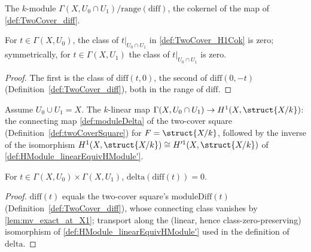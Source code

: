 \begin{definition}
  \label{def:TwoCover_H1Cok}
  \leanok
  The \(k\)-module \(\Gamma(X, U_0 \cap U_1)/\mathrm{range}(\mathrm{diff})\), the cokernel of
  the map of \ref{def:TwoCover_diff}.
\end{definition}

\begin{lemma}
  \label{lem:TwoCover_h1Cok_mk_res}
  \leanok
  For \(t \in \Gamma(X,U_0)\), the class of \(t|_{U_0 \cap U_1}\) in
  \ref{def:TwoCover_H1Cok} is zero; symmetrically, for \(t \in \Gamma(X,U_1)\) the class of
  \(t|_{U_0 \cap U_1}\) is zero.
\end{lemma}
\begin{proof}
  \leanok
  The first is the class of \(\mathrm{diff}(t,0)\), the second of \(\mathrm{diff}(0,-t)\)
  (Definition~\ref{def:TwoCover_diff}), both in the range of \(\mathrm{diff}\).
\end{proof}

\begin{definition}
  \label{def:TwoCover_delta}
  \leanok
  Assume \(U_0 \cup U_1 = X\). The \(k\)-linear map
  \(\Gamma(X, U_0 \cap U_1) \to H^1(X, \struct{X/k})\): the connecting map
  \ref{def:moduleDelta} of the two-cover square (Definition~\ref{def:twoCoverSquare}) for
  \(F = \struct{X/k}\), followed by the inverse of the isomorphism
  \(H^1(X,\struct{X/k}) \cong H'^1(X,\struct{X/k})\) of
  \ref{def:HModule_linearEquivHModule'}.
\end{definition}

\begin{lemma}
  \label{lem:TwoCover_delta_diff}
  \leanok
  For \(t \in \Gamma(X,U_0) \times \Gamma(X,U_1)\), \(\mathrm{delta}(\mathrm{diff}(t)) = 0\).
\end{lemma}
\begin{proof}
  \leanok
  \(\mathrm{diff}(t)\) equals the two-cover square's \(\mathrm{moduleDiff}(t)\)
  (Definition~\ref{def:TwoCover_diff}), whose connecting class vanishes by
  \ref{lem:mv_exact_at_X1}; transport along the (linear, hence class-zero-preserving)
  isomorphism of \ref{def:HModule_linearEquivHModule'} used in the definition of
  \(\mathrm{delta}\).
\end{proof}

